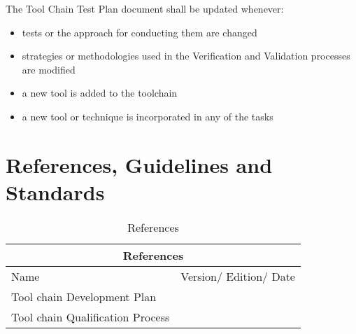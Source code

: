 The Tool Chain Test Plan document shall be updated whenever:
\begin{itemize}
\item tests or the approach for conducting them are changed
\item strategies or methodologies used in the Verification and Validation processes are modified
\item a new tool is added to the toolchain
\item a new tool or technique is incorporated in any of the tasks 
\end{itemize}

\section{References, Guidelines and Standards}

\begin{table}[H]
\begin{tabular}{|m{}|m{3cm}|}
\hline
\multicolumn{2}{|c|}{References} \\\hline
Name &
Version/ Edition/ Date
\\\hline
Tool chain Development Plan &
\\\hline
Tool chain Qualification Process &
 \\\hline
\end{tabular}
\caption{References}
\end{table}


